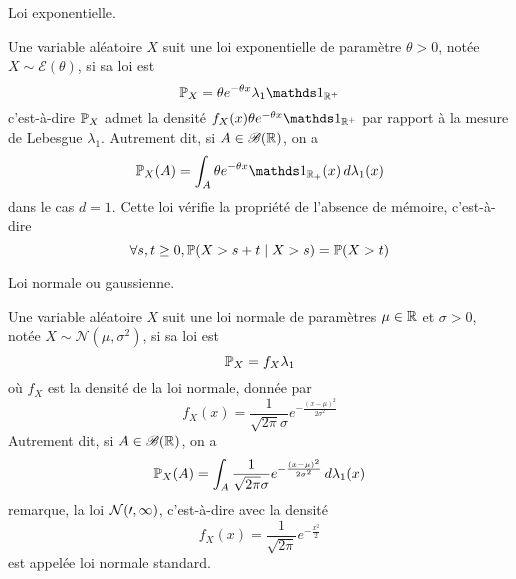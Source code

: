 Loi exponentielle.

Une variable aléatoire \(X\) suit une loi exponentielle de paramètre \(\theta>0\), notée \(X\sim\mathcal E(\theta)\), si sa loi est
\begin{equation*}
    \bb P_X = \theta e^{-\theta x}\lambda_1\one_{\R^+}
\end{equation*}
c'est-à-dire \(\mathbb{P}_X\) admet la densité \(f_X(x)\theta e^{-\theta x}\one_{\R^+}\) par rapport à la mesure de Lebesgue \(\lambda_1\). Autrement dit,
si \(A\in\mathscr{B}(\mathbb{R})\), on a
\begin{equation*}
    \bb P_X(A) = \int_A \theta e^{-\theta x}\one_{\R_+}(x)\der\lambda_1(x)
\end{equation*}
dans le cas \(d=1\). Cette loi vérifie la propriété de l'absence de mémoire, c'est-à-dire
\begin{equation*}
    \forall s,t\geq 0, \mathbb{P}(X>s+t\mid X>s) = \mathbb{P}(X>t)
\end{equation*}


Loi normale ou gaussienne.

Une variable aléatoire \(X\) suit une loi normale de paramètres \(\mu\in\mathbb{R}\) et \(\sigma>0\), notée \(X\sim\mathcal N(\mu,\sigma^2)\), si sa loi est
\begin{equation*}
    \mathbb{P}_X = f_X\lambda_1
\end{equation*}
où \(f_X\) est la densité de la loi normale, donnée par
\begin{equation*}
    f_X(x) = \frac{1}{\sqrt{2\pi}\sigma}e^{-\frac{{(x-\mu)}^2}{2\sigma^2}}
\end{equation*}
Autrement dit, si \(A\in\mathscr{B}(\mathbb{R})\), on a
\begin{equation*}
    \mathbb{P}_X(A) = \int_A \frac{1}{\sqrt{2\pi}\sigma}e^{-\frac{{(x-\mu)}^2}{2\sigma^2}}\mathop{}\!{d}\lambda_1(x)
\end{equation*}
remarque, la loi \(\cal N(0,1)\), c'est-à-dire avec la densité
\begin{equation*}
    f_X(x) = \frac{1}{\sqrt{2\pi}}e^{-\frac{x^2}{2}}
\end{equation*}
est appelée loi normale standard.